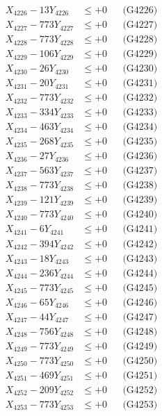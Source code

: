 \documentclass[a4paper,10pt]{article}
\begin{document}
{\begin{align}
X_{4226} - 13Y_{4226} &\leq +0 && \text{(G4226)} \\
X_{4227} - 773Y_{4227} &\leq +0 && \text{(G4227)} \\
X_{4228} - 773Y_{4228} &\leq +0 && \text{(G4228)} \\
X_{4229} - 106Y_{4229} &\leq +0 && \text{(G4229)} \\
X_{4230} - 26Y_{4230} &\leq +0 && \text{(G4230)} \\
\allowbreak
X_{4231} - 20Y_{4231} &\leq +0 && \text{(G4231)} \\
X_{4232} - 773Y_{4232} &\leq +0 && \text{(G4232)} \\
X_{4233} - 334Y_{4233} &\leq +0 && \text{(G4233)} \\
X_{4234} - 463Y_{4234} &\leq +0 && \text{(G4234)} \\
X_{4235} - 268Y_{4235} &\leq +0 && \text{(G4235)} \\
X_{4236} - 27Y_{4236} &\leq +0 && \text{(G4236)} \\
X_{4237} - 563Y_{4237} &\leq +0 && \text{(G4237)} \\
X_{4238} - 773Y_{4238} &\leq +0 && \text{(G4238)} \\
X_{4239} - 121Y_{4239} &\leq +0 && \text{(G4239)} \\
X_{4240} - 773Y_{4240} &\leq +0 && \text{(G4240)} \\
\allowbreak
X_{4241} - 6Y_{4241} &\leq +0 && \text{(G4241)} \\
X_{4242} - 394Y_{4242} &\leq +0 && \text{(G4242)} \\
X_{4243} - 18Y_{4243} &\leq +0 && \text{(G4243)} \\
X_{4244} - 236Y_{4244} &\leq +0 && \text{(G4244)} \\
X_{4245} - 773Y_{4245} &\leq +0 && \text{(G4245)} \\
X_{4246} - 65Y_{4246} &\leq +0 && \text{(G4246)} \\
X_{4247} - 44Y_{4247} &\leq +0 && \text{(G4247)} \\
X_{4248} - 756Y_{4248} &\leq +0 && \text{(G4248)} \\
X_{4249} - 773Y_{4249} &\leq +0 && \text{(G4249)} \\
X_{4250} - 773Y_{4250} &\leq +0 && \text{(G4250)} \\
\allowbreak
X_{4251} - 469Y_{4251} &\leq +0 && \text{(G4251)} \\
X_{4252} - 209Y_{4252} &\leq +0 && \text{(G4252)} \\
X_{4253} - 773Y_{4253} &\leq +0 && \text{(G4253)} \\

\end{align}}
\end{document}
